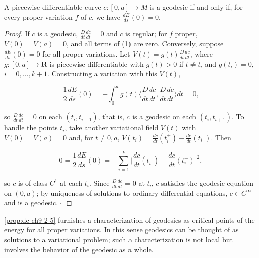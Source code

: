\begin{proposition}
  \label{prop:dc-ch9-2-5}
  A piecewise differentiable curve $c:[0,a]\to M$ is a geodesic if and only if, for
  every proper variation $f$ of $c$, we have $\frac{dE}{ds}(0)=0$.
\end{proposition}
\begin{proof}
  If $c$ is a geodesic, $\frac{D}{dt}\frac{dc}{dt}=0$ and $c$ is regular;
  for $f$ proper, $V(0)=V(a)=0$, and all terms of (1) are zero. Conversely, suppose
  $\frac{dE}{ds}(0)=0$ for all proper variations. Let
  $V(t)=g(t)\frac{D}{dt}\frac{dc}{dt}$, where $g:[0,a]\to\mathbf{R}$ is piecewise
  differentiable with $g(t)>0$ if $t\ne t_i$ and $g(t_i)=0$, $i=0,\dots,k+1$.
  Constructing a variation
  with this $V(t)$,
  
  $$
  \frac{1}{2}\frac{dE}{ds}(0)=-\int_0^a g(t)\Big\langle\frac{D}{dt}\frac{dc}{dt},\frac{D}{dt}\frac{dc}{dt}\Big\rangle dt=0,
  $$
  
  so $\frac{D}{dt}\frac{dc}{dt}=0$ on each $(t_i,t_{i+1})$, that is, $c$ is a geodesic
  on each $(t_i,t_{i+1})$. To handle the points $t_i$, take another variational field
  $\overline V(t)$ with $\overline V(0)=\overline V(a)=0$ and, for $t\ne 0,a$,
  $\overline V(t_i)=\frac{dc}{dt}(t_i^+)-\frac{dc}{dt}(t_i^-)$. Then
  
  $$
  0=\frac{1}{2}\frac{dE}{ds}(0)=-\sum_{i=1}^k\Big|\frac{dc}{dt}(t_i^+)-\frac{dc}{dt}(t_i^-)\Big|^2,
  $$
  
  so $c$ is of class $C^1$ at each $t_i$. Since $\frac{D}{dt}\frac{dc}{dt}=0$ at
  $t_i$, $c$ satisfies the geodesic equation on $(0,a)$; by uniqueness of solutions
  to ordinary differential equations, $c\in C^\infty$ and is a geodesic. $\square$
\end{proof}

\begin{remark}[Remark 2.6]
  \label{rem:dc-ch9-2-6}
  \cref{prop:dc-ch9-2-5} furnishes a characterization of geodesics as critical points of
  the energy for all proper variations. In this sense geodesics can be thought of as
  solutions to a variational problem; such a characterization is not local but
  involves the behavior of the geodesic as a whole.
\end{remark}

